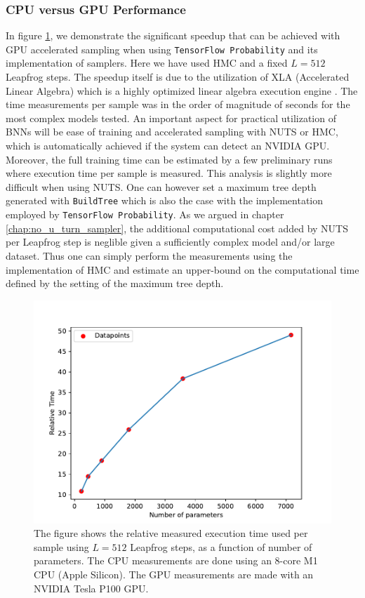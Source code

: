 \subsubsection{CPU versus GPU Performance}
In figure \ref{fig:relative_performance}, we demonstrate the significant speedup that can be achieved
with GPU accelerated sampling when using {\tt TensorFlow Probability} and its implementation of samplers. Here we have used HMC and a fixed $L = 512$ Leapfrog steps.
The speedup itself is due to the utilization of XLA (Accelerated Linear Algebra) which is a highly optimized
linear algebra execution engine \cite{xla}. The time measurements per sample was in the order of magnitude of seconds for the most complex models
tested. An important aspect for practical utilization of BNNs will be ease of training and accelerated sampling with NUTS or HMC, which is automatically achieved if the system can detect an NVIDIA GPU. Moreover, the full training time can be estimated by a few preliminary runs where execution time per sample is measured. This analysis is slightly more difficult when using NUTS. One can however set a maximum tree depth generated with {\tt BuildTree} which is also the case with the implementation employed by {\tt TensorFlow Probability}. As we argued in chapter \ref{chap:no_u_turn_sampler}, the additional computational cost added by NUTS per Leapfrog step is neglible given a sufficiently complex model and/or large dataset.
Thus one can simply perform the measurements using the implementation of HMC and estimate an upper-bound on the computational time defined by the setting of the maximum tree depth.

\begin{figure}
    \centering
    \includegraphics[scale=1]{figures/cpu_vs_gpu/cpu_vs_gpu_performance.pdf}
    \caption{The figure shows the relative measured execution time used per sample using $L = 512$ Leapfrog steps,
    as a function of number of parameters. The CPU measurements are done using an 8-core M1 CPU (Apple Silicon). The GPU measurements
    are made with an NVIDIA Tesla P100 GPU.
    }
    \label{fig:relative_performance}
\end{figure}

